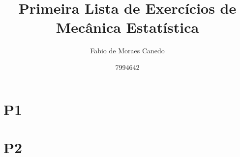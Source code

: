 \documentclass[a4paper,12pt]{article}
\title{Primeira Lista de Exercícios de Mecânica Estatística}
\author{Fabio de Moraes Canedo \and
7994642}
\begin{document}
\maketitle

%

%

\section{P1}



\section{P2}





% 
%
%
\end{document}
